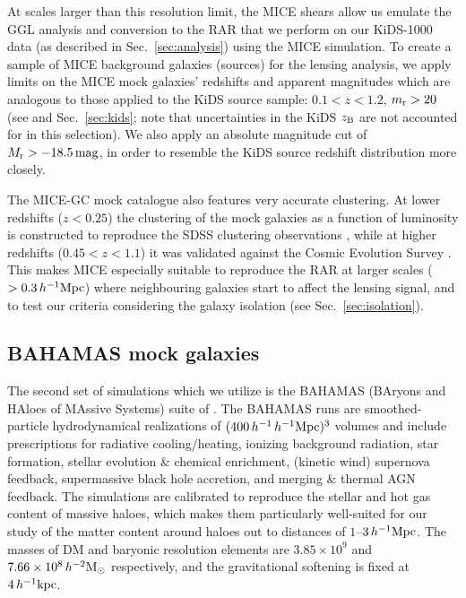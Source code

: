 \documentclass[usenatbib]{mnras}
\newcommand{\hmsun}{\,h^{-2} {\rm M_\odot}}
\newcommand{\hkpc}{\, h^{-1}{\rm{kpc}} }
\newcommand{\hMpc}{\, h^{-1}{\rm{Mpc}} }
\newcommand{\un}[1]{_{\rm #1}}
\begin{document}
At scales larger than this resolution limit, the MICE shears allow us emulate the GGL analysis and conversion to the RAR that we perform on our KiDS-1000 data (as described in Sec.~\ref{sec:analysis}) using the MICE simulation. To create a sample of MICE background galaxies (sources) for the lensing analysis, we apply limits on the MICE mock galaxies' redshifts and apparent magnitudes which are analogous to those applied to the KiDS source sample: $0.1 < z < 1.2$, $m\un{r}>20$ (see \citealp{hildebrandt2017} and Sec.~\ref{sec:kids}; note that uncertainties in the KiDS $z\un{B}$ are not accounted for in this selection). We also apply an absolute magnitude cut of $M\un{r}>-18.5 \, {\rm mag}$, in order to resemble the KiDS source redshift distribution more closely.

The MICE-GC mock catalogue also features very accurate clustering. At lower redshifts ($z<0.25$) the clustering of the mock galaxies as a function of luminosity is constructed to reproduce the SDSS clustering observations \cite[]{zehavi2011}, while at higher redshifts ($0.45<z<1.1$) it was validated against the Cosmic Evolution Survey \cite[COSMOS,][]{ilbert2009}. This makes MICE especially suitable to reproduce the RAR at larger scales ($>0.3\hMpc$) where neighbouring galaxies start to affect the lensing signal, and to test our criteria considering the galaxy isolation (see Sec.~\ref{sec:isolation}).


\subsection{BAHAMAS mock galaxies}
\label{sec:bahamas_mocks}
The second set of simulations which we utilize is the BAHAMAS (BAryons and HAloes of MAssive Systems) suite of \citet{mccarthy2017}. The BAHAMAS runs are smoothed-particle hydrodynamical realizations of $(400\,h^{-1}\hMpc)^3$ volumes and include prescriptions for radiative cooling/heating, ionizing background radiation, star formation, stellar evolution \& chemical enrichment, (kinetic wind) supernova feedback, supermassive black hole accretion, and merging \& thermal AGN feedback. The simulations are calibrated to reproduce the stellar and hot gas content of massive haloes, which makes them particularly well-suited for our study of the matter content around haloes out to distances of $1$--$3\hMpc$. The masses of DM and baryonic resolution elements are $3.85\times 10^9$ and $7.66\times 10^8 \hmsun$ respectively, and the gravitational softening is fixed at $4 \hkpc$.
\end{document}
